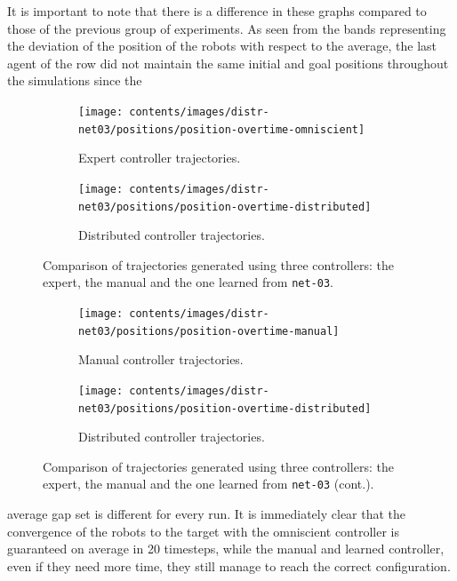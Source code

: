 It is important to note that there is a difference in these graphs compared to 
those of the previous group of experiments. As seen from the bands 
representing the deviation of the position of the robots with respect to the 
average, the last agent of the row did not maintain the same initial and 
goal positions throughout the simulations since the
\begin{figure}[!htb]
	\begin{center}
		\begin{subfigure}[h]{0.49\textwidth}
			\centering
			\texttt{[image: contents/images/distr-net03/positions/position-overtime-omniscient]}%
			\caption{Expert controller trajectories.}
		\end{subfigure}
		\hfill
		\begin{subfigure}[h]{0.49\textwidth}
			\centering
			\texttt{[image: contents/images/distr-net03/positions/position-overtime-distributed]}
			\caption{Distributed controller trajectories.}
		\end{subfigure}
	\end{center}
	\caption[Evaluation of the trajectories learned by 
	\texttt{net-03}.]{Comparison of trajectories generated using three 
	controllers: the expert, the manual and the one learned from 
	\texttt{net-03}.}
\end{figure}
\medskip

\begin{figure}[!htb]\ContinuedFloat
	\centering
	\begin{subfigure}[h]{0.49\textwidth}
		\centering			
		\texttt{[image: contents/images/distr-net03/positions/position-overtime-manual]}%
		\caption{Manual controller trajectories.}
	\end{subfigure}
	\hfill
	\begin{subfigure}[h]{0.49\textwidth}
		\centering
		\texttt{[image: contents/images/distr-net03/positions/position-overtime-distributed]}
		\caption{Distributed controller trajectories.}
	\end{subfigure}
	\caption[]{Comparison of trajectories generated using three controllers: 
	the expert, the manual and the one learned from \texttt{net-03} (cont.).}
	\label{fig:net03traj}
\end{figure}

\noindent
average gap set is different for every run.
It is immediately clear that the convergence of the robots to the target 
with the omniscient controller is guaranteed on average in 20 timesteps, 
while the manual and learned controller, even if they need more time, they 
still manage to reach the correct configuration.

